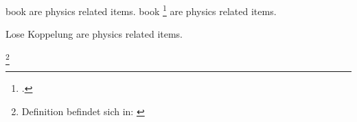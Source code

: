 \documentclass{article}
\begin{document}
	
	book  are physics related items. 
	book \footcite[S. 12]{Martin2009} are physics related items. 
	
	\bigskip
	
	Lose Koppelung  \cite[S. 12]{messaging} are physics related items. 
		
\footnote{Definition befindet sich in: \cite[S. 123]{schummelzettel}}
	
	\nocite{*}
	\clearpage
	\printbibliography
	
	
\end{document}
